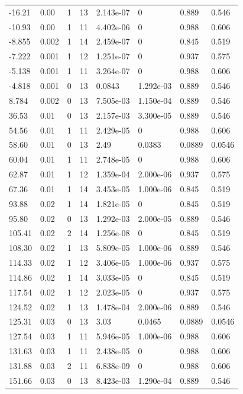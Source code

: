 \documentclass[preview]{standalone}
\begin{document}
{{\begin{tabular}{L{1.2cm}C{1.2cm} C{0.3cm}C{0.5cm} C{1.4cm}C{1.4cm} C{1.4cm}C{1.4cm}}
  -16.21  &  0.00  & 1     & 13 &  2.143e-07  & 0  & 0.889 &  0.546   \\ 
  -10.93  &  0.00  & 1     & 11 &  4.402e-06  & 0  & 0.988 &  0.606   \\ 
  -8.855  &  0.002  & 1     & 14 &  2.459e-07  & 0  & 0.845 &  0.519   \\ 
  -7.222  &  0.001  & 1     & 12 &  1.251e-07  & 0  & 0.937 &  0.575   \\ 
  -5.138  &  0.001  & 1     & 11 &  3.264e-07  & 0  & 0.988 &  0.606   \\ 
  -4.818  &  0.001  & 0     & 13 &  0.0843  & 1.292e-03  & 0.889 &  0.546   \\ 
  8.784  &  0.002  & 0     & 13 &  7.505e-03  & 1.150e-04  & 0.889 &  0.546   \\ 
  36.53  &  0.01  & 0     & 13 &  2.157e-03  & 3.300e-05  & 0.889 &  0.546   \\ 
  54.56  &  0.01  & 1     & 11 &  2.429e-05  & 0  & 0.988 &  0.606   \\ 
  58.60  &  0.01  & 0     & 13 &  2.49  & 0.0383  & 0.0889 &  0.0546   \\ 
  60.04  &  0.01  & 1     & 11 &  2.748e-05  & 0  & 0.988 &  0.606   \\ 
  62.87  &  0.01  & 1     & 12 &  1.359e-04  & 2.000e-06  & 0.937 &  0.575   \\ 
  67.36  &  0.01  & 1     & 14 &  3.453e-05  & 1.000e-06  & 0.845 &  0.519   \\ 
  93.88  &  0.02  & 1     & 14 &  1.821e-05  & 0  & 0.845 &  0.519   \\ 
  95.80  &  0.02  & 0     & 13 &  1.292e-03  & 2.000e-05  & 0.889 &  0.546   \\ 
  105.41  &  0.02  & 2     & 14 &  1.256e-08  & 0  & 0.845 &  0.519   \\ 
  108.30  &  0.02  & 1     & 13 &  5.809e-05  & 1.000e-06  & 0.889 &  0.546   \\ 
  114.33  &  0.02  & 1     & 12 &  3.406e-05  & 1.000e-06  & 0.937 &  0.575   \\ 
  114.86  &  0.02  & 1     & 14 &  3.033e-05  & 0  & 0.845 &  0.519   \\ 
  117.54  &  0.02  & 1     & 12 &  2.023e-05  & 0  & 0.937 &  0.575   \\ 
  124.52  &  0.02  & 1     & 13 &  1.478e-04  & 2.000e-06  & 0.889 &  0.546   \\ 
  125.31  &  0.03  & 0     & 13 &  3.03  & 0.0465  & 0.0889 &  0.0546   \\ 
  127.54  &  0.03  & 1     & 11 &  5.946e-05  & 1.000e-06  & 0.988 &  0.606   \\ 
  131.63  &  0.03  & 1     & 11 &  2.438e-05  & 0  & 0.988 &  0.606   \\ 
  131.88  &  0.03  & 2     & 11 &  6.838e-09  & 0  & 0.988 &  0.606   \\ 
  151.66  &  0.03  & 0     & 13 &  8.423e-03  & 1.290e-04  & 0.889 &  0.546   \\ 
\hline 
\end{tabular} 

}}
\end{document}
